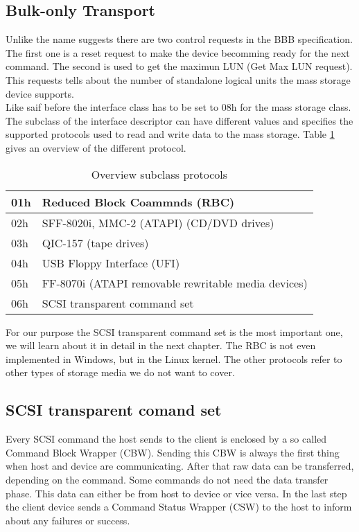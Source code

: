 \subsection{Bulk-only Transport}

Unlike the name suggests there are two control requests in the BBB specification. The first one is a reset request to make the device becomming ready for the next command. The second is used to get the maximun LUN (Get Max LUN request). This requests tells about the number of standalone logical units the mass storage device supports.\\
Like saif before the interface class has to be set to 08h for the mass storage class. The subclass of the interface descriptor can have different values and specifies the supported protocols used to read and write data to the mass storage. Table \ref{table:subclass} gives an overview of the different protocol.

\begin{table}[ht]
\caption{Overview subclass protocols}
\centering
\begin{tabular}{|l|l|}
\hline\hline
01h & Reduced Block Coammnds (RBC) \\ \hline
02h & SFF-8020i, MMC-2 (ATAPI) (CD/DVD drives) \\ \hline
03h & QIC-157 (tape drives) \\ \hline
04h & USB Floppy Interface (UFI) \\ \hline
05h & FF-8070i (ATAPI removable rewritable media devices) \\ \hline
06h & SCSI transparent command set \\ \hline
\end{tabular}
\label{table:subclass}
\end{table}

For our purpose the SCSI transparent command set is the most important one, we will learn about it in detail in the next chapter. The RBC is not even implemented in Windows, but in the Linux kernel. The other protocols refer to other types of storage media we do not want to cover.

\subsection{SCSI transparent comand set}

Every SCSI command the host sends to the client is enclosed by a so called Command Block Wrapper (CBW). Sending this CBW is always the first thing when host and device are communicating. After that raw data can be transferred, depending on the command. Some commands do not need the data transfer phase. This data can either be from host to device or vice versa. In the last step the client device sends a Command Status Wrapper (CSW) to the host to inform about any failures or success.\\

